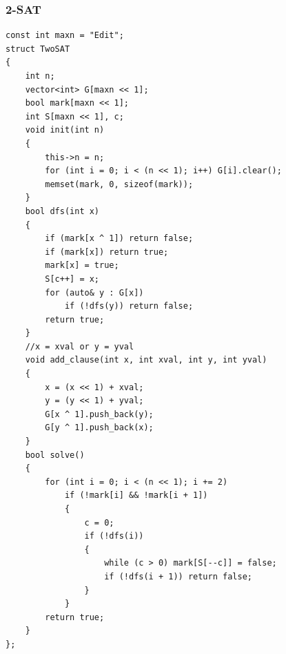 \documentclass[twoside]{article}
\begin{document}
\subsubsection{2-SAT}
\begin{lstlisting}
const int maxn = "Edit";
struct TwoSAT
{
    int n;
    vector<int> G[maxn << 1];
    bool mark[maxn << 1];
    int S[maxn << 1], c;
    void init(int n)
    {
        this->n = n;
        for (int i = 0; i < (n << 1); i++) G[i].clear();
        memset(mark, 0, sizeof(mark));
    }
    bool dfs(int x)
    {
        if (mark[x ^ 1]) return false;
        if (mark[x]) return true;
        mark[x] = true;
        S[c++] = x;
        for (auto& y : G[x])
            if (!dfs(y)) return false;
        return true;
    }
    //x = xval or y = yval
    void add_clause(int x, int xval, int y, int yval)
    {
        x = (x << 1) + xval;
        y = (y << 1) + yval;
        G[x ^ 1].push_back(y);
        G[y ^ 1].push_back(x);
    }
    bool solve()
    {
        for (int i = 0; i < (n << 1); i += 2)
            if (!mark[i] && !mark[i + 1])
            {
                c = 0;
                if (!dfs(i))
                {
                    while (c > 0) mark[S[--c]] = false;
                    if (!dfs(i + 1)) return false;
                }
            }
        return true;
    }
};
\end{lstlisting}
\end{document}
